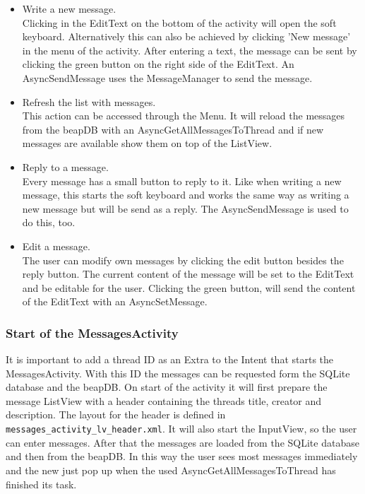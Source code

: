 \documentclass[12pt,a4paper,oneside]{report}
\newcommand{\beapDB}{beapDB}
\newcommand{\code}[1]{\lstinline{#1}}
\begin{document}
\begin{itemize}
\item Write a new message.\\
Clicking in the EditText on the bottom of the activity will open the soft keyboard. Alternatively this can also be achieved by clicking 'New message' in the menu of the activity. After entering a text, the message can be sent by clicking the green button on the right side of the EditText. An AsyncSendMessage uses the MessageManager to send the message.

\item Refresh the list with messages.\\
This action can be accessed through the Menu. It will reload the messages from the \beapDB{} with an AsyncGetAllMessagesToThread and if new messages are available show them on top of the ListView.

\item Reply to a message.\\
Every message has a small button to reply to it. Like when writing a new message, this starts the soft keyboard and works the same way as writing a new message but will be send as a reply. The AsyncSendMessage is used to do this, too.

\item Edit a message.\\
The user can modify own messages by clicking the edit button besides the reply button. The current content of the message will be set to the EditText and be editable for the user. Clicking the green button, will send the content of the EditText with an AsyncSetMessage.

\end{itemize}

\subsubsection{Start of the MessagesActivity}
It is important to add a thread ID as an Extra to the Intent that starts the MessagesActivity. With this ID the messages can be requested form the SQLite database and the \beapDB{}. On start of the activity it will first prepare the message ListView with a header containing the threads title, creator and description. The layout for the header is defined in \code{messages_activity_lv_header.xml}. It will also start the InputView, so the user can enter messages. After that the messages are loaded from the SQLite database and then from the \beapDB{}. In this way the user sees most messages immediately and the new just pop up when the used AsyncGetAllMessagesToThread has finished its task. 
\end{document}
